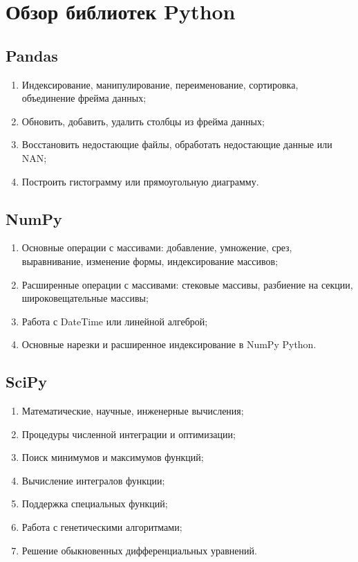 \section{Обзор библиотек Python}

\subsection{Pandas}

\begin{enumerate}
	\item Индексирование, манипулирование, переименование, сортировка, объединение фрейма данных;
	\item Обновить, добавить, удалить столбцы из фрейма данных;
	\item Восстановить недостающие файлы, обработать недостающие данные или NAN;
	\item Построить гистограмму или прямоугольную диаграмму.
\end{enumerate}

\subsection{NumPy}

\begin{enumerate}
	\item Основные операции с массивами: добавление, умножение, срез, выравнивание, изменение формы, индексирование массивов;
	\item Расширенные операции с массивами: стековые массивы, разбиение на секции, широковещательные массивы;
	\item Работа с DateTime или линейной алгеброй;
	\item Основные нарезки и расширенное индексирование в NumPy Python.
\end{enumerate}

\subsection{SciPy}

\begin{enumerate}
	\item Математические, научные, инженерные вычисления;	
	\item Процедуры численной интеграции и оптимизации;
	\item Поиск минимумов и максимумов функций;
	\item Вычисление интегралов функции;
	\item Поддержка специальных функций;
	\item Работа с генетическими алгоритмами;
	\item Решение обыкновенных дифференциальных уравнений.
\end{enumerate}

